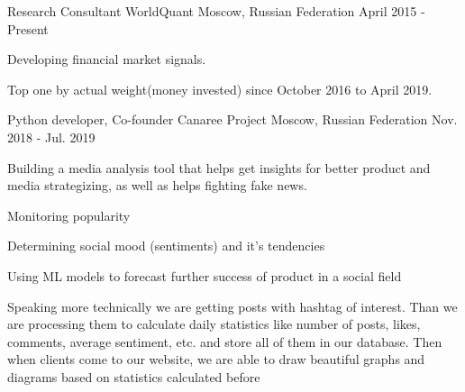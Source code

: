 

\begin{cventries}

  \cventry
    {Research Consultant} %
    {WorldQuant} %
    {Moscow, Russian Federation} %
    {April 2015 - Present} %
    {
      \begin{cvitems} %
        \item {Developing financial market signals.}
        \item {Top one by actual weight(money invested) since October 2016 to April 2019. }
      \end{cvitems}
    }

  \cventry
    {Python developer, Co-founder} %
    {Canaree Project} %
    {Moscow, Russian Federation} %
    {Nov. 2018 - Jul. 2019} %
    {
      \begin{cvitems} %
        \item {Building a media analysis tool that helps get insights for better product and media strategizing, as well as helps fighting fake news.}
        \item {Monitoring popularity}
        \item {Determining social mood (sentiments) and it's tendencies}
        \item {Using ML models to forecast further success of product in a social field}
        \item {Speaking more technically we are getting posts with hashtag of interest.
        Than we are processing them to calculate daily statistics like number of posts,
        likes, comments, average sentiment, etc. and store all of them in our database.
        Then when clients come to our website, we are able to draw beautiful graphs and
        diagrams based on statistics calculated before
        }
      \end{cvitems}
    }


\end{cventries}
